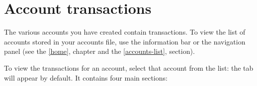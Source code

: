 
\chapter{Account transactions\label{transactions}}

The various accounts you have created contain transactions. To view the list of accounts stored in your accounts file, use the information bar or the navigation panel (see the \vref{home},  chapter and the \vref{accounts-list},  section).

To view the transactions for an account, select that account from the list: the  tab will appear by default. It contains four main sections:

